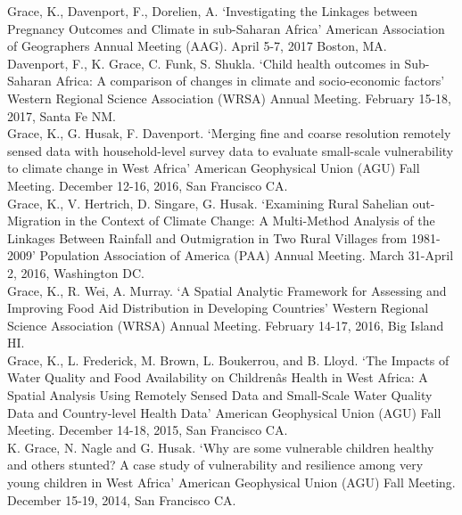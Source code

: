 \documentclass[11pt]{article} %
\begin{document}
\noindent
Grace, K., Davenport, F., Dorelien, A. `Investigating the Linkages between Pregnancy Outcomes and Climate in sub-Saharan Africa' American Association of Geographers Annual Meeting  (AAG).  April 5-7, 2017 Boston, MA. \\



\noindent
Davenport, F., K. Grace, C. Funk, S. Shukla. `Child health outcomes in Sub-Saharan Africa: A comparison of changes in climate and socio-economic factors' Western Regional Science Association (WRSA) Annual Meeting. February 15-18, 2017, Santa Fe NM.\\


\noindent
Grace, K.,  G. Husak, F. Davenport. `Merging fine and coarse resolution remotely sensed data with household-level survey data to evaluate small-scale vulnerability to climate change in West Africa'  American Geophysical Union (AGU) Fall Meeting.  December 12-16, 2016, San Francisco CA.\\ 

\noindent
Grace, K., V. Hertrich, D. Singare, G. Husak. `Examining Rural Sahelian out-Migration in the Context of Climate Change: A Multi-Method Analysis of the Linkages Between Rainfall and Outmigration in Two Rural Villages from 1981-2009' Population Association of America (PAA) Annual Meeting. March 31-April 2, 2016, Washington DC.\\

\noindent
Grace, K., R. Wei, A. Murray. `A Spatial Analytic Framework for Assessing and Improving Food Aid Distribution in Developing Countries' Western Regional Science Association (WRSA) Annual Meeting. February 14-17, 2016, Big Island HI.\\

\noindent
Grace, K., L. Frederick, M. Brown, L. Boukerrou, and B. Lloyd. `The Impacts of Water Quality and Food Availability on Childrenâs Health in West Africa: A Spatial Analysis Using Remotely Sensed Data and Small-Scale Water Quality Data and Country-level Health Data' American Geophysical Union (AGU) Fall Meeting.  December 14-18, 2015, San Francisco CA.\\

\noindent
K. Grace, N. Nagle and G. Husak. `Why are some vulnerable children healthy and others stunted? A case study of vulnerability and resilience among very young children in West Africa' American Geophysical Union (AGU) Fall Meeting.  December 15-19, 2014, San Francisco CA.\\
\end{document}
